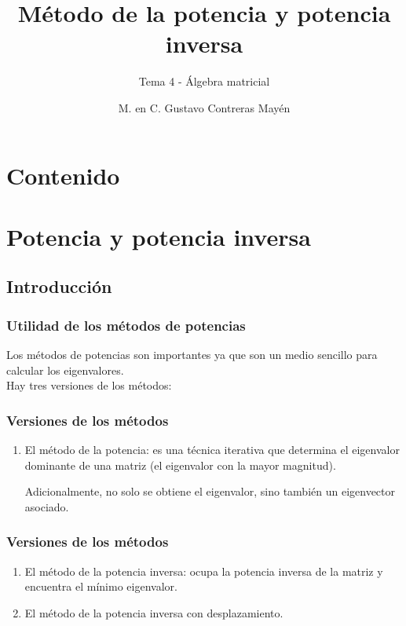 \documentclass[12pt]{beamer}
\title{\large{Método de la potencia y potencia inversa}}
\subtitle{Tema 4 - Álgebra matricial}
\author{M. en C. Gustavo Contreras Mayén}
\date{}
\begin{document}
\maketitle

\section*{Contenido}

\section{Potencia y potencia inversa}
\subsection{Introducción}

\begin{frame}
\frametitle{Utilidad de los métodos de potencias}
Los métodos de potencias son importantes ya que son un medio sencillo para calcular los eigenvalores.
\\
\bigskip
\pause
Hay tres versiones de los métodos:
\end{frame}
\begin{frame}
\frametitle{Versiones de los métodos}
\begin{enumerate}[<+->]
\item El método de la potencia: es una técnica iterativa que determina el eigenvalor dominante de una matriz (el eigenvalor con la mayor magnitud).

Adicionalmente, no solo se obtiene el eigenvalor, sino también un eigenvector asociado.
\seti
\end{enumerate}
\end{frame}
\begin{frame}
\frametitle{Versiones de los métodos}
\begin{enumerate}[<+->]
\conti
\item El método de la potencia inversa: ocupa la potencia inversa de la matriz y encuentra el mínimo eigenvalor.
\item El método de la potencia inversa con desplazamiento.
\end{enumerate}
\end{frame}
\end{document}

